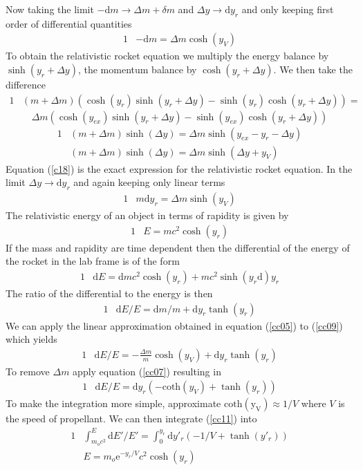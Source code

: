 \documentclass[]{article}
\numberwithin{equation}{subsection}
\begin{document}
Now taking the limit $-\mathrm{d}m\rightarrow\Delta m+\delta m$ and $\Delta y\rightarrow\mathrm{d}y_{r}$ and only keeping first order of differential quantities
\begin{alignat}{1}
	\label{cc05}	&-\mathrm{d}m=\Delta m\cosh(y_{V})
\end{alignat}
 To obtain the relativistic rocket equation we multiply the energy balance by $\sinh(y_{r}+\Delta y)$, the momentum balance by $\cosh(y_{r}+\Delta y)$. We then take the difference  
\begin{alignat}{1}
	\label{cc06}	&(m+\Delta m)(\cosh(y_{r})\sinh(y_{r}+\Delta y)-\sinh(y_{r})\cosh(y_{r}+\Delta y))=
\end{alignat}
$$
	\Delta m(\cosh(y_{ex})\sinh(y_{r}+\Delta y)-\sinh(y_{ex})\cosh(y_{r}+\Delta y))
$$
\begin{alignat}{1}
	\label{c17}	&(m+\Delta m)\sinh(\Delta y)=\Delta m\sinh(y_{ex}-y_{r}-\Delta y)\\
	\label{c18}	&(m+\Delta m)\sinh(\Delta y)=\Delta m\sinh(\Delta y+y_{V})
\end{alignat}
Equation (\ref{c18}) is the exact expression for the relativistic rocket equation. In the limit $\Delta y\rightarrow\mathrm{d}y_{r}$ and again keeping only linear terms
\begin{alignat}{1}
	\label{cc07}	&m\mathrm{d}y_{r}=\Delta m\sinh(y_{V})
\end{alignat}
The relativistic energy of an object in terms of rapidity is given by
\begin{alignat}{1}
	\label{c19}	&E=mc^{2}\cosh(y_{r})
\end{alignat}
If the mass and rapidity are time dependent then the differential of the energy of the rocket in the lab frame is of the form
\begin{alignat}{1}
	\label{cc08}	&\mathrm{d}E=\mathrm{d}mc^{2}\cosh(y_{r})+mc^{2}\sinh(y_{r}\mathrm{d})y_{r}
\end{alignat}
The ratio of the differential to the energy is then
\begin{alignat}{1}
	\label{cc09}	&\mathrm{d}E/E=\mathrm{d}m/m+\mathrm{d}y_{r}\tanh(y_{r})
\end{alignat}
We can apply the linear approximation obtained in equation (\ref{cc05}) to (\ref{cc09}) which yields
\begin{alignat}{1}
	\label{cc10}	&\mathrm{d}E/E=-\frac{\Delta m}{m}\cosh(y_{V})+\mathrm{d}y_{r}\tanh(y_{r})
\end{alignat}
To remove $\Delta m$ apply equation (\ref{cc07}) resulting in
\begin{alignat}{1}
	\label{cc11}	&\mathrm{d}E/E=\mathrm{d}y_{r}(-\mathrm{coth}(y_{V})+\tanh(y_{r}))
\end{alignat}
To make the integration more simple, approximate $\mathrm{coth(y_{V})}\approx1/V$ where $V$ is the speed of propellant. We can then integrate (\ref{cc11}) into
\begin{alignat}{1}
	\label{cc12}	&\int^{E}_{m_{o}c^{2}}\mathrm{d}E'/E'=\int^{y_{r}}_{0}\mathrm{d}y'_{r}(-1/V+\tanh(y'_{r}))\\
	\label{cc13}	&E=m_{o}\mathrm{e}^{-y_{r}/V}c^{2}\cosh(y_{r})
\end{alignat}
\end{document}
